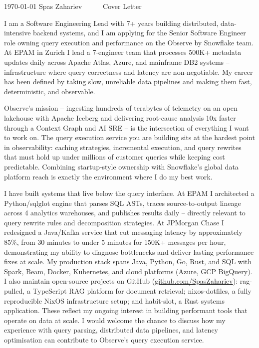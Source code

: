 \documentclass[11pt, a4paper]{awesome-cv}
\begin{document}
\makecvheader[R]

\makecvfooter
  {\today}
  {Spas Zahariev~~~\textperiodcentered~~~Cover Letter}
  {}

\makelettertitle

\begin{cvletter}

I am a Software Engineering Lead with 7+ years building distributed, data-intensive backend systems, and I am applying for the Senior Software Engineer role owning query execution and performance on the Observe by Snowflake team. At EPAM in Zurich I lead a 7-engineer team that processes 500K+ metadata updates daily across Apache Atlas, Azure, and mainframe DB2 systems -- infrastructure where query correctness and latency are non-negotiable. My career has been defined by taking slow, unreliable data pipelines and making them fast, deterministic, and observable.

Observe's mission -- ingesting hundreds of terabytes of telemetry on an open lakehouse with Apache Iceberg and delivering root-cause analysis 10x faster through a Context Graph and AI SRE -- is the intersection of everything I want to work on. The query execution service you are building sits at the hardest point in observability: caching strategies, incremental execution, and query rewrites that must hold up under millions of customer queries while keeping cost predictable. Combining startup-style ownership with Snowflake's global data platform reach is exactly the environment where I do my best work.

I have built systems that live below the query interface. At EPAM I architected a Python/sqlglot engine that parses SQL ASTs, traces source-to-output lineage across 4 analytics warehouses, and publishes results daily -- directly relevant to query rewrite rules and decomposition strategies. At JPMorgan Chase I redesigned a Java/Kafka service that cut messaging latency by approximately 85\%, from 30 minutes to under 5 minutes for 150K+ messages per hour, demonstrating my ability to diagnose bottlenecks and deliver lasting performance fixes at scale. My production stack spans Java, Python, Go, Rust, and SQL with Spark, Beam, Docker, Kubernetes, and cloud platforms (Azure, GCP BigQuery). I also maintain open-source projects on GitHub (\url{github.com/SpasZahariev}): rag-pulled, a TypeScript RAG platform for document retrieval; nixos-dotfiles, a fully reproducible NixOS infrastructure setup; and habit-slot, a Rust systems application. These reflect my ongoing interest in building performant tools that operate on data at scale. I would welcome the chance to discuss how my experience with query parsing, distributed data pipelines, and latency optimisation can contribute to Observe's query execution service.

\end{cvletter}


\makeletterclosing
\end{document}
